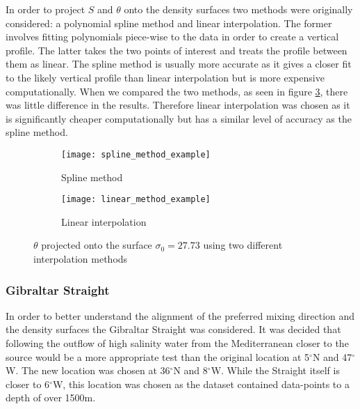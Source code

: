 In order to project $S$ and $\theta$ onto the density surfaces two methods were originally considered: a polynomial spline method and linear interpolation. The former involves fitting polynomials piece-wise to the data in order to create a vertical profile. The latter takes the two points of interest and treats the profile between them as linear. The spline method is usually more accurate as it gives a closer fit to the likely vertical profile than linear interpolation but is more expensive computationally.  When we compared the two methods, as seen in figure \ref{fig:polyvslinear}, there
was little difference in the results. Therefore linear interpolation was chosen as it
is signiﬁcantly cheaper computationally but has a similar level of accuracy as the spline method.

\begin{figure}[htbp]
    \centering
    \begin{subfigure}[b]{0.4\textwidth}
         \centering
         \texttt{[image: spline\_method\_example]}
         \caption{Spline method}
         \label{fig:subplot_poly_spline}
     \end{subfigure}
     \hfill
     \begin{subfigure}[b]{0.4\textwidth}
         \centering
         \texttt{[image: linear\_method\_example]}
         \caption{Linear interpolation}
         \label{fig:subplot_linear_inter}
     \end{subfigure}
    \caption{$\theta$ projected onto the surface $\sigma_0 = 27.73$ using two different interpolation methods}
    \label{fig:polyvslinear}
\end{figure}

\subsubsection{Gibraltar Straight}
\label{subsubsection:spreadmethodgibraltarstraight}

In order to better understand the alignment of the preferred mixing direction and the density surfaces the Gibraltar Straight was considered. It was decided that following the outflow of high salinity water from the Mediterranean closer to the source would be a more appropriate test than the original location at 5$^{\circ}$N and 47$^{\circ}$W. The new location was chosen at 36$^{\circ}$N and 8$^{\circ}$W. While the Straight itself is closer to 
6$^{\circ}$W, this location was chosen as the dataset contained data-points to a depth of over 1500m. 

